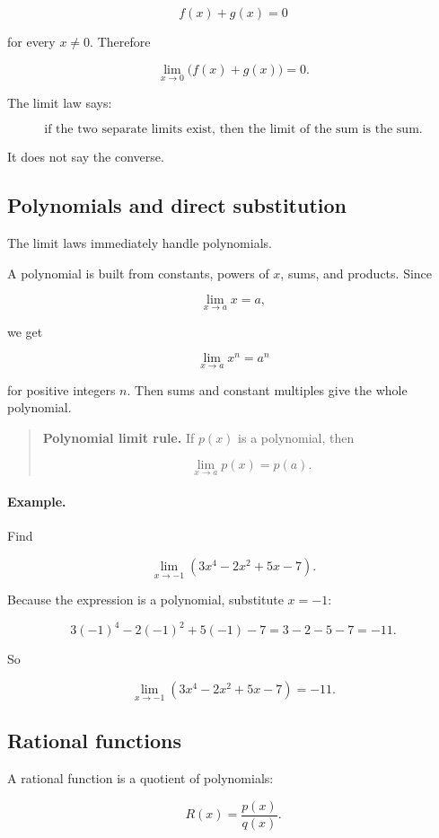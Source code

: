 \[
f(x)+g(x)=0
\]

for every \(x\neq0\).  Therefore

\[
\lim_{x\to0}\bigl(f(x)+g(x)\bigr)=0.
\]

The limit law says:

\[
\text{if the two separate limits exist, then the limit of the sum is the sum.}
\]

It does not say the converse.

\subsection{Polynomials and direct substitution}
\label{subsec:polynomials-direct-substitution}

The limit laws immediately handle polynomials.

A polynomial is built from constants, powers of \(x\), sums, and products.  Since

\[
\lim_{x\to a}x=a,
\]

we get

\[
\lim_{x\to a}x^n=a^n
\]

for positive integers \(n\).  Then sums and constant multiples give the whole polynomial.

\begin{quote}
\textbf{Polynomial limit rule.}
If \(p(x)\) is a polynomial, then

\[
\lim_{x\to a}p(x)=p(a).
\]
\end{quote}

\paragraph{Example.}
Find

\[
\lim_{x\to -1}(3x^4-2x^2+5x-7).
\]

Because the expression is a polynomial, substitute \(x=-1\):

\[
3(-1)^4-2(-1)^2+5(-1)-7
=
3-2-5-7
=
-11.
\]

So

\[
\lim_{x\to -1}(3x^4-2x^2+5x-7)=-11.
\]

\subsection{Rational functions}
\label{subsec:rational-functions-limits}

A rational function is a quotient of polynomials:

\[
R(x)=\frac{p(x)}{q(x)}.
\]

